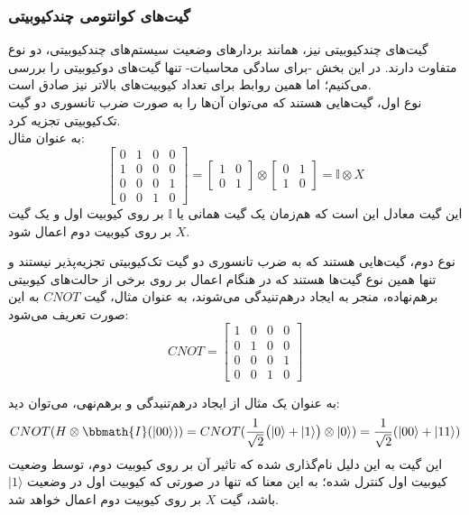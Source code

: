 \subsubsection{
    گیت‌های کوانتومی چند‌کیوبیتی
}
گیت‌های چندکیوبیتی نیز، همانند بردارهای وضعیت سیستم‌های چندکیوبیتی، دو نوع متفاوت دارند. در این بخش -برای سادگی محاسبات- تنها گیت‌های دوکیوبیتی را بررسی می‌کنیم؛ اما همین روابط برای تعداد کیوبیت‌های بالاتر نیز صادق است. \\
نوع اول، گیت‌هایی هستند که می‌توان آن‌ها را به صورت ضرب تانسوری دو گیت تک‌کیوبیتی تجزیه کرد.
\\
به عنوان مثال:
\begin{equation}
    \begin{bmatrix}
    0 & 1 & 0 & 0 \\[3pt]
    1 & 0 & 0 & 0 \\[3pt]
    0 & 0 & 0 & 1 \\[3pt]
    0 & 0 & 1 & 0 
    \end{bmatrix} =
    \begin{bmatrix}
    1 & 0 \\[3pt]
    0 & 1 
    \end{bmatrix} \otimes
    \begin{bmatrix}
    0 & 1 \\[3pt]
    1 & 0
    \end{bmatrix}
    = \mathbb{I} \otimes X
\end{equation}
این گیت معادل این است که هم‌زمان یک گیت همانی یا
$\mathbb{I}$
بر روی کیوبیت اول و یک گیت
$X$
بر روی کیوبیت دوم اعمال شود.

نوع دوم، گیت‌هایی هستند که به ضرب تانسوری دو گیت تک‌کیوبیتی تجزیه‌پذیر نیستند و تنها همین نوع گیت‌ها هستند که در هنگام اعمال بر روی برخی از حالت‌های کیوبیتی برهم‌نهاده، منجر به ایجاد درهم‌تنیدگی می‌شوند، به عنوان مثال، گیت
$CNOT$ به این صورت تعریف می‌شود:
\begin{equation}
    CNOT = \begin{bmatrix}
    1 & 0 & 0 & 0 \\[3pt]
    0 & 1 & 0 & 0 \\[3pt]
    0 & 0 & 0 & 1 \\[3pt]
    0 & 0 & 1 & 0 
    \end{bmatrix}
\end{equation}

به عنوان یک مثال از ایجاد درهم‌تنیدگی و برهم‌نهی، می‌توان دید:
\begin{equation}
    CNOT(H \otimes \bbmath{I}(|00\rangle)) = CNOT(\frac{1}{\sqrt{2}} \big( |0\rangle + |1\rangle \big) \otimes |0\rangle ) = \frac{1}{\sqrt{2}} (|00\rangle + |11\rangle)
\end{equation}
این گیت به این دلیل نام‌گذاری شده که تاثیر آن بر روی کیوبیت دوم، توسط وضعیت کیوبیت اول کنترل شده؛ به این معنا که تنها در صورتی که کیوبیت اول در وضعیت
$|1\rangle$
باشد، گیت 
$X$
بر روی کیوبیت دوم اعمال خواهد شد.


